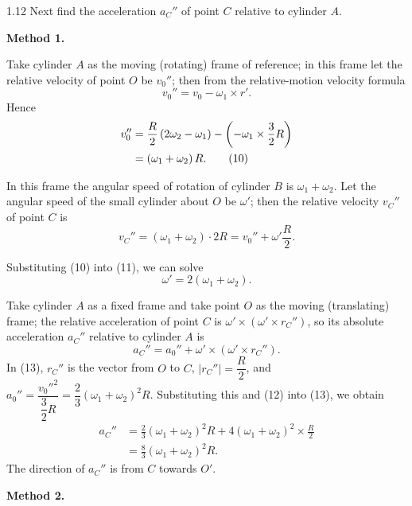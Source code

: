\begin{solution}{1.12}
Next find the acceleration $a_C''$ of point $C$ relative to cylinder $A$.

\textbf{Method 1.}

Take cylinder $A$ as the moving (rotating) frame of reference; in this frame let the relative
velocity of point $O$ be $v_0''$; then from the relative-motion velocity formula
\begin{equation*}
v_0'' = v_0-\omega_1\times r'.
\end{equation*}
Hence
\begin{align}
v_0'' &= \frac{R}{2}\left(2\omega_2-\omega_1\right)
-\left(-\omega_1\times\frac{3}{2}R\right)\notag\\
&= \left(\omega_1+\omega_2\right)R. \tag{10}
\end{align}

In this frame the angular speed of rotation of cylinder $B$ is $\omega_1+\omega_2$. Let the
angular speed of the small cylinder about $O$ be $\omega'$; then the relative velocity $v_C''$ of
point $C$ is
\begin{equation}
v_C'' = \left(\omega_1+\omega_2\right)\cdot 2R = v_0''+\omega'\frac{R}{2}. \tag{11}
\end{equation}

Substituting (10) into (11), we can solve
\begin{equation}
\omega' = 2\left(\omega_1+\omega_2\right). \tag{12}
\end{equation}

Take cylinder $A$ as a fixed frame and take point $O$ as the moving (translating) frame; the
relative acceleration of point $C$ is $\omega'\times\left(\omega'\times r_C''\right)$, so its
absolute acceleration $a_C''$ relative to cylinder $A$ is
\begin{equation}
a_C'' = a_0''+\omega'\times\left(\omega'\times r_C''\right). \tag{13}
\end{equation}
In (13), $r_C''$ is the vector from $O$ to $C$, $|r_C''|=\dfrac{R}{2}$, and
$a_0''=\dfrac{v_0''^2}{\dfrac{3}{2}R}=\dfrac{2}{3}\left(\omega_1+\omega_2\right)^2R$.
Substituting this and (12) into (13), we obtain
\begin{align*}
a_C'' &= \frac{2}{3}\left(\omega_1+\omega_2\right)^2R
+4\left(\omega_1+\omega_2\right)^2\times\frac{R}{2}\\
&= \frac{8}{3}\left(\omega_1+\omega_2\right)^2R.
\end{align*}
The direction of $a_C''$ is from $C$ towards $O'$.

\textbf{Method 2.}


\end{solution}
